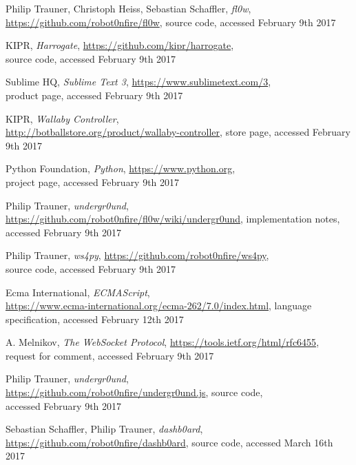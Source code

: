 \documentclass[conference,a4paper]{IEEEtran}
\begin{document}
\begin{thebibliography}{1}

Philip Trauner, Christoph Heiss, Sebastian Schaffler, \emph{fl0w}, \url{https://github.com/robot0nfire/fl0w}, source code,
accessed February 9th 2017

KIPR, \emph{Harrogate}, \url{https://github.com/kipr/harrogate}, \\ source code,
accessed February 9th 2017

Sublime HQ, \emph{Sublime Text 3}, \url{https://www.sublimetext.com/3},\\ product page,
accessed February 9th 2017

KIPR, \emph{Wallaby Controller},\\  \url{http://botballstore.org/product/wallaby-controller}, store page, accessed February 9th 2017

Python Foundation, \emph{Python}, \url{https://www.python.org},\\ project page,
accessed February 9th 2017

Philip Trauner, \emph{undergr0und}, \url{https://github.com/robot0nfire/fl0w/wiki/undergr0und}, implementation notes,
accessed February 9th 2017

Philip Trauner, \emph{ws4py}, \url{https://github.com/robot0nfire/ws4py},\\ source code,
accessed February 9th 2017

Ecma International, \emph{ECMAScript}, \\\url{https://www.ecma-international.org/ecma-262/7.0/index.html}, language specification, accessed February 12th 2017

A. Melnikov, \emph{The WebSocket Protocol}, \url{https://tools.ietf.org/html/rfc6455},\\ request for comment,
accessed February 9th 2017

Philip Trauner, \emph{undergr0und},\\ \url{https://github.com/robot0nfire/undergr0und.js}, source code, \\accessed February 9th 2017

Sebastian Schaffler, Philip Trauner, \emph{dashb0ard}, \url{https://github.com/robot0nfire/dashb0ard}, source code,
accessed March 16th 2017


\end{thebibliography}
\end{document}
